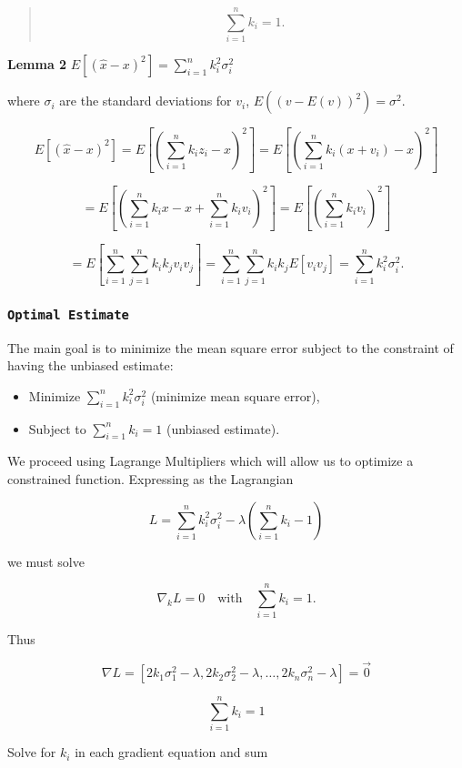 \begin{quote}
\[\sum_{i=1}^n k_i = 1 .\]
\end{quote}

\textbf{Lemma 2} \(E[(\hat{x}-x)^2] =  \sum_{i=1}^n k_i^2\sigma_i^2\)

where \(\sigma_i\) are the standard deviations for \(v_i\),
\(E((v-E(v))^2)=\sigma^2\).

\[E[(\hat{x}-x)^2] =  E\left[\left(\sum_{i=1}^n k_i z_i - x\right)^2\right]
=  E\left[\left(\sum_{i=1}^n k_i (x+v_i) - x\right)^2\right]\]

\[= E\left[\left(\sum_{i=1}^n k_i x - x + \sum_{i=1}^n k_i v_i \right)^2\right]=
E\left[\left(\sum_{i=1}^n k_i v_i \right)^2\right]\]

\[=E\left[\sum_{i=1}^n \sum_{j=1}^n k_ik_j v_iv_j \right]
= \sum_{i=1}^n \sum_{j=1}^n k_ik_j E[v_iv_j] = \sum_{i=1}^n k_i^2\sigma_i^2 .\]

\hypertarget{optimal-estimate}{%
\subsubsection{\texorpdfstring{\texttt{Optimal\ Estimate}}{Optimal Estimate}}\label{optimal-estimate}}

The main goal is to minimize the mean square error subject to the
constraint of having the unbiased estimate:

\begin{itemize}
\tightlist
\item
  Minimize \(\sum_{i=1}^n k_i^2\sigma_i^2\) (minimize mean square
  error),
\item
  Subject to \(\sum_{i=1}^n k_i = 1\) (unbiased estimate).
\end{itemize}

We proceed using Lagrange Multipliers which will allow us to optimize a
constrained function. Expressing as the Lagrangian

\[L = \sum_{i=1}^n k_i^2\sigma_i^2 - \lambda \left( \sum_{i=1}^n k_i - 1\right)\]

we must solve

\[\nabla_k L =0 \quad \text{with} \quad \sum_{i=1}^n k_i = 1 .\]

Thus

\[\nabla L =
\left[ 2k_1\sigma_1^2 - \lambda , 2k_2\sigma_2^2 - \lambda, \dots, 2k_n\sigma_n^2 - \lambda\right]=\vec{0}\]

\[\sum_{i=1}^n k_i = 1\]

Solve for \(k_i\) in each gradient equation and sum

